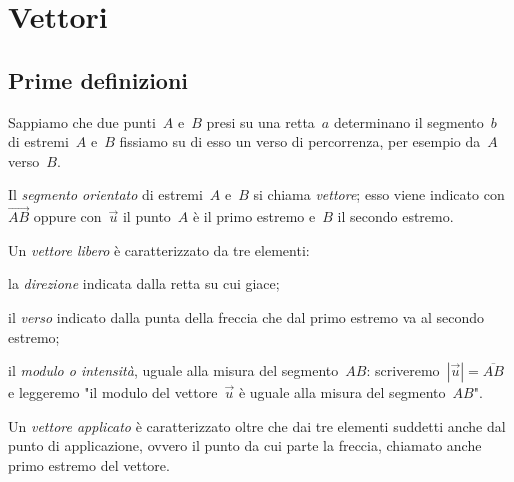
\chapter{Vettori}

\section{Prime definizioni}
\label{sec:vett_primedefinizioni}

% 

Sappiamo che due punti~$A$ e~$B$ presi su una retta~$a$ determinano il 
segmento~$b$ di estremi~$A$ e~$B$ fissiamo su di esso un verso di percorrenza, 
per esempio da~$A$ verso~$B$.
\begin{definizione}
Il \emph{segmento orientato} di estremi~$A$ e~$B$ si chiama \emph{vettore}; 
esso viene indicato con~$\overrightarrow{AB}$ oppure con~$\vec{u}$
il punto~$A$ è il primo estremo e~$B$ il secondo estremo.
\end{definizione}
Un \emph{vettore libero} è caratterizzato da tre elementi:
\begin{itemize*}
\item la \emph{direzione} indicata dalla retta su cui giace;
\item il \emph{verso} indicato dalla punta della freccia che dal primo estremo 
va al secondo estremo;
\item il \emph{modulo o intensità}, uguale alla misura del segmento~$AB$: 
scriveremo~$|\vec{u}|=\overline{AB}$ e leggeremo "il modulo del 
vettore~$\vec{u}$ è
uguale alla misura del segmento~$AB$".
\end{itemize*}
Un \emph{vettore applicato} è caratterizzato oltre che dai tre elementi 
suddetti anche dal punto di applicazione,
ovvero il punto da cui parte la freccia, chiamato anche primo estremo del 
vettore.

